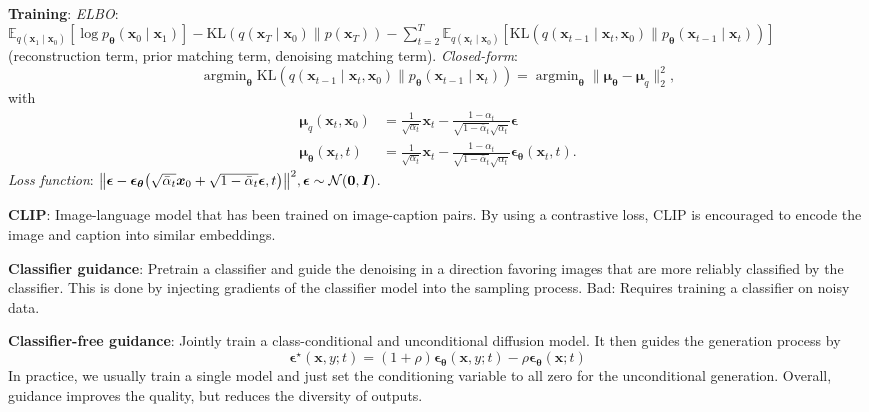\documentclass{article}
\DeclareMathOperator*{\argmin}{argmin}
\newcommand{\lft}{\mathopen{}\mathclose\bgroup\left}
\newcommand{\rgt}{\aftergroup\egroup\right}
\newcommand{\E}{\mathbb{E}}
\renewcommand{\vec}[1]{\bm{#1}}
\newcommand{\mat}[1]{\bm{#1}}
\newenvironment{topic}[1]
{\textbf{\sffamily \colorbox{black}{\rlap{\textbf{\textcolor{white}{#1}}}\hspace{\linewidth}\hspace{-2\fboxsep}}} \\ \vspace{0.2cm}}
{}
\begin{document}
\begin{multicols*}{2}
\begin{topic}{Diffusion models}
        \textbf{Training}: \textit{ELBO}: $\E_{q(\vec{x}_1\mid \vec{x}_0)}[\log p_{\vec{\theta}}(\vec{x}_0 \mid \vec{x}_1)] - \mathrm{KL}(q(\vec{x}_T \mid \vec{x}_0) \| p(\vec{x}_T)) - \sum_{t=2}^{T} \E_{q(\vec{x}_t \mid \vec{x}_0)} [\mathrm{KL}(q(\vec{x}_{t-1} \mid \vec{x}_t, \vec{x}_0) \| p_{\vec{\theta}}(\vec{x}_{t-1} \mid \vec{x}_t))]$ (reconstruction term, prior matching term, denoising matching term).
        \textit{Closed-form}: \[
            \argmin\nolimits_{\vec{\theta}} \mathrm{KL}(q(\vec{x}_{t-1} \mid \vec{x}_t, \vec{x}_0) \| p_{\vec{\theta}}(\vec{x}_{t-1} \mid \vec{x}_t)) = \argmin\nolimits_{\vec{\theta}} \| \vec{\mu}_{\vec{\theta}} - \vec{\mu}_q \|_2^2,
        \]
        with
        \begin{align*}
            \vec{\mu}_q(\vec{x}_t, \vec{x}_0)      & = \frac{1}{\sqrt{\alpha_t}} \vec{x}_t - \frac{1-\alpha_t}{\sqrt{1-\bar{\alpha}_t} \sqrt{\alpha_t}} \vec{\epsilon}                                 \\
            \vec{\mu}_{\vec{\theta}}(\vec{x}_t, t) & = \frac{1}{\sqrt{\alpha_t}} \vec{x}_t - \frac{1 - \alpha_t}{\sqrt{1-\bar{\alpha}_t} \sqrt{\alpha_t}} \vec{\epsilon}_{\vec{\theta}}(\vec{x}_t, t).
        \end{align*}
        \textit{Loss function}: $\lft\| \vec{\epsilon} - \vec{\epsilon}_{\vec{\theta}}\lft(
            \sqrt{\bar{\alpha}_t} \vec{x}_0 + \sqrt{1 - \bar{\alpha}_t} \vec{\epsilon}, t \rgt) \rgt\|^2,
            \vec{\epsilon} \sim \mathcal{N}(\vec{0}, \mat{I})$.

        \textbf{CLIP}: Image-language model that has been trained on image-caption pairs. By using a
        contrastive loss, CLIP is encouraged to encode the image and caption into similar embeddings.

        \textbf{Classifier guidance}: Pretrain a classifier and guide the denoising in a direction
        favoring images that are more reliably classified by the classifier. This is done by
        injecting gradients of the classifier model into the sampling process. Bad: Requires
        training a classifier on noisy data.

        \textbf{Classifier-free guidance}: Jointly train a class-conditional and unconditional diffusion model. It then guides the generation process by \[
            \vec{\epsilon}^\star(\vec{x}, y; t) = (1 + \rho) \vec{\epsilon}_{\vec{\theta}}(\vec{x}, y; t) - \rho \vec{\epsilon}_{\vec{\theta}}(\vec{x}; t)
        \]
        In practice, we usually train a single model and just set the conditioning variable to all zero for
        the unconditional generation. Overall, guidance improves the quality, but reduces the diversity of
        outputs.


\end{topic}
\end{multicols*}
\end{document}
